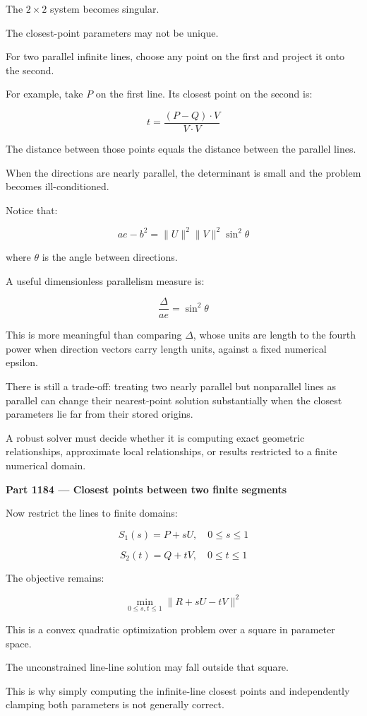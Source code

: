 The \(2\times2\) system becomes singular.

The closest-point parameters may not be unique.

For two parallel infinite lines, choose any point on the first and project it onto the second.

For example, take \(P\) on the first line. Its closest point on the second is:

\[
t=\frac{(P-Q)\cdot V}{V\cdot V}
\]

The distance between those points equals the distance between the parallel lines.

When the directions are nearly parallel, the determinant is small and the problem becomes ill-conditioned.

Notice that:

\[
ae-b^2 = \|U\|^2\|V\|^2\sin^2\theta
\]

where \(\theta\) is the angle between directions.

A useful dimensionless parallelism measure is:

\[
\boxed{ \frac{\Delta}{ae}=\sin^2\theta }
\]

This is more meaningful than comparing \(\Delta\), whose units are length to the fourth power when direction vectors carry length units, against a fixed numerical epsilon.

There is still a trade-off: treating two nearly parallel but nonparallel lines as parallel can change their nearest-point solution substantially when the closest parameters lie far from their stored origins.

A robust solver must decide whether it is computing exact geometric relationships, approximate local relationships, or results restricted to a finite numerical domain.

\textbf{Part 1184 --- Closest points between two finite segments}

Now restrict the lines to finite domains:

\[
S_1(s)=P+sU,\quad 0\le s\le1
\]

\[
S_2(t)=Q+tV,\quad 0\le t\le1
\]

The objective remains:

\[
\boxed{ \min_{0\le s,t\le1} \|R+sU-tV\|^2 }
\]

This is a convex quadratic optimization problem over a square in parameter space.

The unconstrained line-line solution may fall outside that square.

This is why simply computing the infinite-line closest points and independently clamping both parameters is not generally correct.

